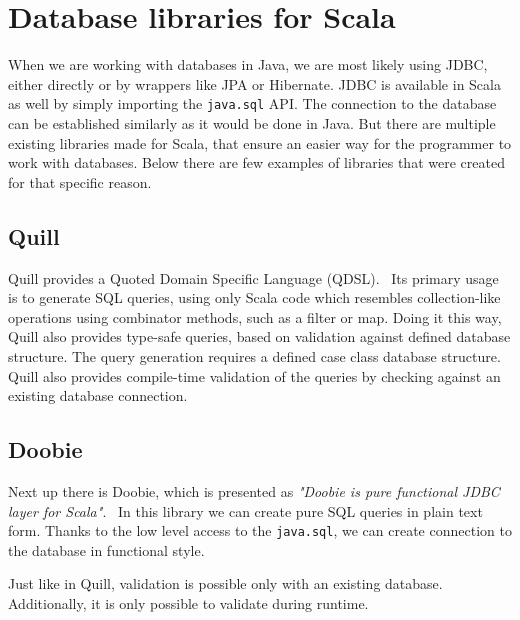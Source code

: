\section{Database libraries for Scala}
When we are working with databases in Java, we are most likely using JDBC, either directly or by wrappers like JPA or Hibernate. JDBC is available in Scala as well by simply importing the \texttt{java.sql} API. The connection to the database can be established similarly as it would be done in Java. But there are multiple existing libraries made for Scala, that ensure an easier way for the programmer to work with databases. Below there are few examples of libraries that were created for that specific reason.

\subsection{Quill}
Quill provides a Quoted Domain Specific Language (QDSL).~\cite{Quill} Its primary usage is to generate SQL queries, using only Scala code which resembles collection-like operations using combinator methods, such as a filter or map. Doing it this way, Quill also provides type-safe queries, based on validation against defined database structure. The query generation requires a defined case class database structure. Quill also provides compile-time validation of the queries by checking against an existing database connection.

\subsection{Doobie}
Next up there is Doobie, which is presented as \textit{"Doobie is pure functional JDBC layer for Scala"}.~\cite{Doobie} In this library we can create pure SQL queries in plain text form. Thanks to the low level access to the \texttt{java.sql}, we can create connection to the database in functional style. 

Just like in Quill, validation is possible only with an existing database. Additionally, it is only possible to validate during runtime.


